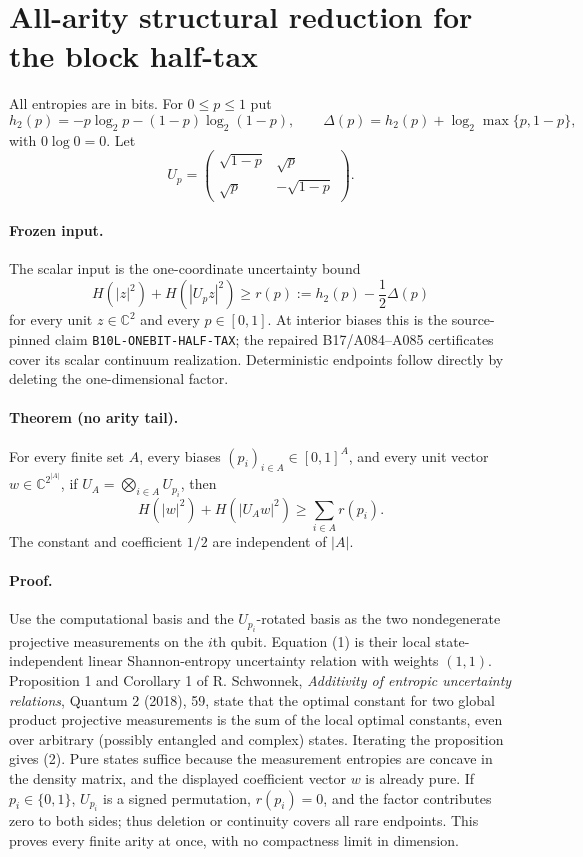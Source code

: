 \section*{All-arity structural reduction for the block half-tax}

All entropies are in bits.  For $0\le p\le1$ put
\[
 h_2(p)=-p\log_2p-(1-p)\log_2(1-p),\qquad
 \Delta(p)=h_2(p)+\log_2\max\{p,1-p\},
\]
with $0\log 0=0$.  Let
\[
 U_p=\begin{pmatrix}\sqrt{1-p}&\sqrt p\\
                     \sqrt p&-\sqrt{1-p}\end{pmatrix}.
\]

\paragraph{Frozen input.}
The scalar input is the one-coordinate uncertainty bound
\[
 H(|z|^2)+H(|U_pz|^2)\ge r(p):=h_2(p)-\frac12\Delta(p)       \tag{1}
\]
for every unit $z\in\mathbb C^2$ and every $p\in[0,1]$.
At interior biases this is the source-pinned claim
\texttt{B10L-ONEBIT-HALF-TAX}; the repaired B17/A084--A085
certificates cover its scalar continuum realization.  Deterministic
endpoints follow directly by deleting the one-dimensional factor.

\paragraph{Theorem (no arity tail).}
For every finite set $A$, every biases $(p_i)_{i\in A}\in[0,1]^A$, and
every unit vector $w\in\mathbb C^{2^{|A|}}$, if
$U_A=\bigotimes_{i\in A}U_{p_i}$, then
\[
 H(|w|^2)+H(|U_Aw|^2)\ge\sum_{i\in A}r(p_i).                \tag{2}
\]
The constant and coefficient $1/2$ are independent of $|A|$.

\paragraph{Proof.}
Use the computational basis and the $U_{p_i}$-rotated basis as the two
nondegenerate projective measurements on the $i$th qubit.  Equation (1)
is their local state-independent linear Shannon-entropy uncertainty
relation with weights $(1,1)$.  Proposition 1 and Corollary 1 of
R. Schwonnek, \emph{Additivity of entropic uncertainty relations},
Quantum 2 (2018), 59, state that the optimal constant for two global
product projective measurements is the sum of the local optimal constants,
even over arbitrary (possibly entangled and complex) states.  Iterating the
proposition gives (2).  Pure states suffice because the measurement
entropies are concave in the density matrix, and the displayed coefficient
vector $w$ is already pure.  If $p_i\in\{0,1\}$, $U_{p_i}$ is a signed
permutation, $r(p_i)=0$, and the factor contributes zero to both sides;
thus deletion or continuity covers all rare endpoints.  This proves every
finite arity at once, with no compactness limit in dimension.

